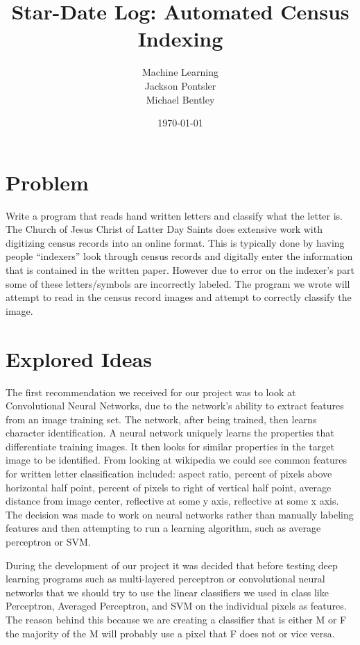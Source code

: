 \documentclass[11pt]{article}
\title{Star-Date Log: Automated Census Indexing}
\author{
  Machine Learning \\
  Jackson Pontsler \\
  Michael Bentley
  }
\date{\today}
\begin{document}
\maketitle


\section{Problem}

Write a program that reads hand written letters and classify what the letter is.
The Church of Jesus Christ of Latter Day Saints does extensive work with digitizing census records into an online format.  This is typically done by having people “indexers” look through census records and digitally enter the information that is contained in the written paper. However due to error on the indexer’s part some of these letters/symbols are incorrectly labeled. The program we wrote will attempt to read in the census record images and attempt to correctly classify the image.


\section{Explored Ideas}

The first recommendation we received for our project was to look at Convolutional Neural Networks, due to the network's ability to extract features from an image training set. The network, after being trained, then learns character identification. A neural network uniquely learns the properties that differentiate training images. It then looks for similar properties in the target image to be identified. From looking at wikipedia we could see common features for written letter classification included: aspect ratio, percent of pixels above horizontal half point, percent of pixels to right of vertical half point, average distance from image center, reflective at some y axis, reflective at some x axis.  The decision was made to work on neural networks rather than manually labeling features and then attempting to run a learning algorithm, such as average perceptron or SVM.

During the development of our project it was decided that before testing deep learning programs such as multi-layered perceptron or convolutional neural networks that we should try to use the linear classifiers we used in class like Perceptron, Averaged Perceptron, and SVM on the individual pixels as features.  The reason behind this because we are creating a classifier that is either M or F the majority of the M will probably use a pixel that F does not or vice versa.
\end{document}
